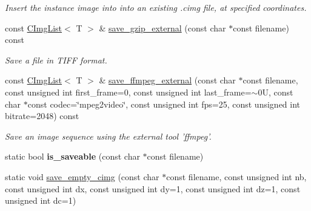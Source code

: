 \begin{DoxyCompactItemize}
\begin{DoxyCompactList}\small\item\em Insert the instance image into into an existing .cimg file, at specified coordinates. \item\end{DoxyCompactList}\item 
const \hyperlink{structcimg__library_1_1CImgList}{CImgList}$<$ T $>$ \& \hyperlink{structcimg__library_1_1CImgList_ae9d11f1d698df3ffe1ef4a9ede594e1e}{save\_\-gzip\_\-external} (const char $\ast$const filename) const 
\begin{DoxyCompactList}\small\item\em Save a file in TIFF format. \item\end{DoxyCompactList}\item 
\hypertarget{structcimg__library_1_1CImgList_aeb3bfe7ec629509dfebe65a6c3704180}{
const \hyperlink{structcimg__library_1_1CImgList}{CImgList}$<$ T $>$ \& \hyperlink{structcimg__library_1_1CImgList_aeb3bfe7ec629509dfebe65a6c3704180}{save\_\-ffmpeg\_\-external} (const char $\ast$const filename, const unsigned int first\_\-frame=0, const unsigned int last\_\-frame=$\sim$0U, const char $\ast$const codec=\char`\"{}mpeg2video\char`\"{}, const unsigned int fps=25, const unsigned int bitrate=2048) const }
\label{structcimg__library_1_1CImgList_aeb3bfe7ec629509dfebe65a6c3704180}

\begin{DoxyCompactList}\small\item\em Save an image sequence using the external tool 'ffmpeg'. \item\end{DoxyCompactList}\item 
\hypertarget{structcimg__library_1_1CImgList_ae6b840a6196e38324e09f24c4d8591d4}{
static bool {\bfseries is\_\-saveable} (const char $\ast$const filename)}
\label{structcimg__library_1_1CImgList_ae6b840a6196e38324e09f24c4d8591d4}

\item 
\hypertarget{structcimg__library_1_1CImgList_a3cb95e9115f5a5c48f93a87f65265a42}{
static void \hyperlink{structcimg__library_1_1CImgList_a3cb95e9115f5a5c48f93a87f65265a42}{save\_\-empty\_\-cimg} (const char $\ast$const filename, const unsigned int nb, const unsigned int dx, const unsigned int dy=1, const unsigned int dz=1, const unsigned int dc=1)}
\label{structcimg__library_1_1CImgList_a3cb95e9115f5a5c48f93a87f65265a42}


\end{DoxyCompactItemize}
